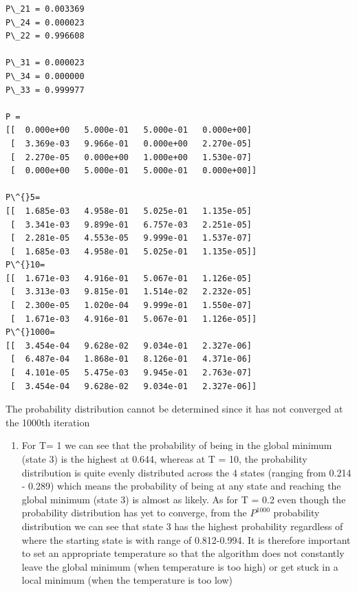 \documentclass[11pt]{article}
\providecommand{\tightlist}{%
      \setlength{\itemsep}{0pt}\setlength{\parskip}{0pt}}
\begin{document}
    \begin{Verbatim}[commandchars=\\\{\}]
P\_21 = 0.003369
P\_24 = 0.000023
P\_22 = 0.996608

P\_31 = 0.000023
P\_34 = 0.000000
P\_33 = 0.999977

P = 
[[  0.000e+00   5.000e-01   5.000e-01   0.000e+00]
 [  3.369e-03   9.966e-01   0.000e+00   2.270e-05]
 [  2.270e-05   0.000e+00   1.000e+00   1.530e-07]
 [  0.000e+00   5.000e-01   5.000e-01   0.000e+00]]

P\^{}5=
[[  1.685e-03   4.958e-01   5.025e-01   1.135e-05]
 [  3.341e-03   9.899e-01   6.757e-03   2.251e-05]
 [  2.281e-05   4.553e-05   9.999e-01   1.537e-07]
 [  1.685e-03   4.958e-01   5.025e-01   1.135e-05]]
P\^{}10=
[[  1.671e-03   4.916e-01   5.067e-01   1.126e-05]
 [  3.313e-03   9.815e-01   1.514e-02   2.232e-05]
 [  2.300e-05   1.020e-04   9.999e-01   1.550e-07]
 [  1.671e-03   4.916e-01   5.067e-01   1.126e-05]]
P\^{}1000=
[[  3.454e-04   9.628e-02   9.034e-01   2.327e-06]
 [  6.487e-04   1.868e-01   8.126e-01   4.371e-06]
 [  4.101e-05   5.475e-03   9.945e-01   2.763e-07]
 [  3.454e-04   9.628e-02   9.034e-01   2.327e-06]]

    \end{Verbatim}

    The probability distribution cannot be determined since it has not
converged at the 1000th iteration

    \begin{enumerate}
\def\labelenumi{\alph{enumi})}
\setcounter{enumi}{5}
\tightlist
\newpage
\item
  For T= 1 we can see that the probability of being in the global
  minimum (state 3) is the highest at 0.644, whereas at T = 10, the
  probability distribution is quite evenly distributed across the 4
  states (ranging from 0.214 - 0.289) which means the probability of
  being at any state and reaching the global minimum (state 3) is almost
  as likely. As for T = 0.2 even though the probability distribution has
  yet to converge, from the \(P^{1000}\) probability distribution we can
  see that state 3 has the highest probability regardless of where the
  starting state is with range of 0.812-0.994. It is therefore important
  to set an appropriate temperature so that the algorithm does not
  constantly leave the global minimum (when temperature is too high) or
  get stuck in a local minimum (when the temperature is too low)
\end{enumerate}
\end{document}
